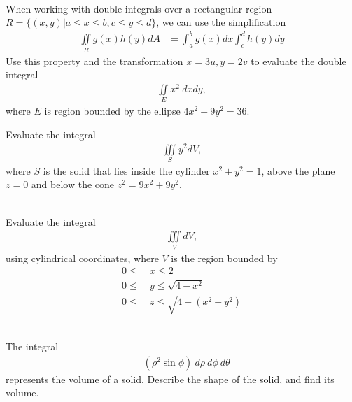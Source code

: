 \documentclass{article}
\begin{document}
\item %
 \\
When working with double integrals over a rectangular region $R=\{(x,y) | a \le x \le b, c\le y \le d\}$, we can use the simplification
\begin{align*}
   \iint\limits_{R} g(x) h(y) dA 
  & = \int_a^b g(x) dx \int_c^d h(y) dy  
\end{align*}
Use this property and the transformation $x = 3u, y = 2v$ to evaluate the double integral
\begin{align*}
  \iint\limits_E x^2 \ dxdy,
\end{align*}
where $E$ is region bounded by the ellipse $4x^2 + 9y^2 = 36$. 
\item %
Evaluate the integral
\begin{align*}
  \iiint\limits_S y^2dV,
\end{align*}
where $S$ is the solid that lies inside the cylinder $x^2+y^2 = 1$, above the plane $z=0$ and below the cone $z^2 = 9x^2 + 9y^2$. 
\item %
 \\
Evaluate the integral
\begin{align*}
  \iiint\limits_V dV,
\end{align*}
using cylindrical coordinates, where $V$ is the region bounded by
\begin{align*}
  0 \le\ &x \le 2 \\
  0 \le\ &y \le \sqrt{4 - x^2}\\
  0 \le\ &z \le \sqrt{4 - (x^2+ y^2)}
\end{align*} 
\item %
 \\
The integral
\begin{align*}
  \mathop{\int_0^{\pi/4} \!\! \int_{0}^{\pi/2} \!\! \int_0^1 } ( \rho^2 \sin\phi ) \ d\rho\  d\phi\  d\theta
\end{align*}
represents the volume of a solid. Describe the shape of the solid, and find its volume. \\
\end{document}
